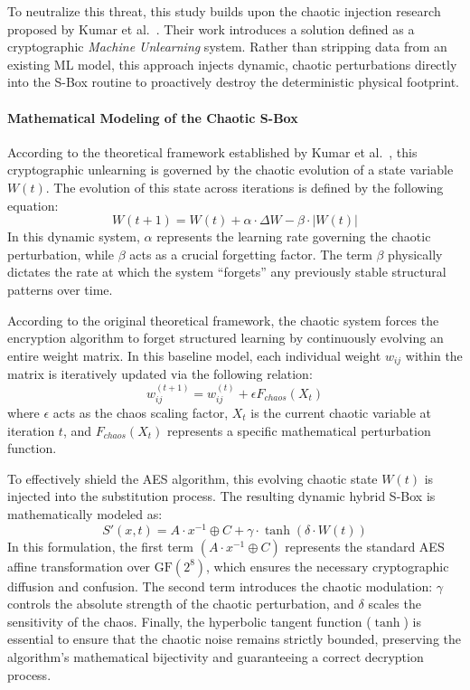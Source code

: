 \documentclass[11pt,a4paper]{report}
\begin{document}
To neutralize this threat, this study builds upon the chaotic injection research proposed by Kumar et al.~\cite{KumarPaper}. 
Their work introduces a solution defined as a cryptographic \textit{Machine Unlearning} system. 
Rather than stripping data from an existing ML model, this approach injects dynamic, chaotic perturbations directly into the S-Box routine to proactively destroy the deterministic physical footprint.

\paragraph{Mathematical Modeling of the Chaotic S-Box}
According to the theoretical framework established by Kumar et al.~\cite[p. 161]{KumarPaper}, this cryptographic unlearning is governed by the chaotic evolution of a state variable $W(t)$. 
The evolution of this state across iterations is defined by the following equation:
\begin{equation}
    W(t+1) = W(t) + \alpha \cdot \Delta W - \beta \cdot |W(t)|
    \label{eq:chaotic_evolution}
\end{equation}
In this dynamic system, $\alpha$ represents the learning rate governing the chaotic perturbation, while $\beta$ acts as a crucial forgetting factor. 
The term $\beta$ physically dictates the rate at which the system ``forgets'' any previously stable structural patterns over time.

According to the original theoretical framework, the chaotic system forces the encryption algorithm to forget structured learning by continuously evolving an entire weight matrix. 
In this baseline model, each individual weight $w_{ij}$ within the matrix is iteratively updated via the following relation:
\begin{equation}
    w_{ij}^{(t+1)} = w_{ij}^{(t)} + \epsilon F_{chaos}(X_t)
    \label{eq:matrix_update}
\end{equation}
where $\epsilon$ acts as the chaos scaling factor, $X_t$ is the current chaotic variable at iteration $t$, and $F_{chaos}(X_t)$ represents a specific mathematical perturbation function. 

To effectively shield the AES algorithm, this evolving chaotic state $W(t)$ is injected into the substitution process. 
The resulting dynamic hybrid S-Box is mathematically modeled as:
\begin{equation}
    S'(x,t) = A \cdot x^{-1} \oplus C + \gamma \cdot \tanh(\delta \cdot W(t))
    \label{eq:chaotic_sbox}
\end{equation}
In this formulation, the first term $(A \cdot x^{-1} \oplus C)$ represents the standard AES affine transformation over $\mathrm{GF}(2^8)$, which ensures the necessary cryptographic diffusion and confusion. 
The second term introduces the chaotic modulation: $\gamma$ controls the absolute strength of the chaotic perturbation, and $\delta$ scales the sensitivity of the chaos. 
Finally, the hyperbolic tangent function ($\tanh$) is essential to ensure that the chaotic noise remains strictly bounded, preserving the algorithm's mathematical bijectivity and guaranteeing a correct decryption process.
\end{document}
